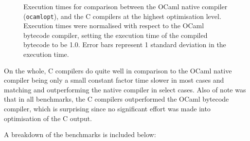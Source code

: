 \documentclass[12pt,a4paper,twoside,openright]{report}
\begin{document}
\begin{figure}
    \centering
    \caption{Execution times for comparison between the OCaml native compiler 
    (\texttt{ocamlopt}), and the C compilers at the highest optimisation level. 
    Execution times were normalised with respect to the OCaml bytecode 
    compiler, setting the execution time of the compiled bytecode to be 1.0. 
    Error bars represent 1 standard deviation in the execution time.}
    \label{fig:raw-benchmarks}
\end{figure}

On the whole, C compilers do quite well in comparison to the OCaml native 
compiler being only a small constant factor time slower in most cases and 
matching and outperforming the native compiler in select cases. Also of note 
was that in all benchmarks, the C compilers outperformed the OCaml bytecode 
compiler, which is surprising since no significant effort was made into 
optimisation of the C output.

A breakdown of the benchmarks is included below:
\end{document}

